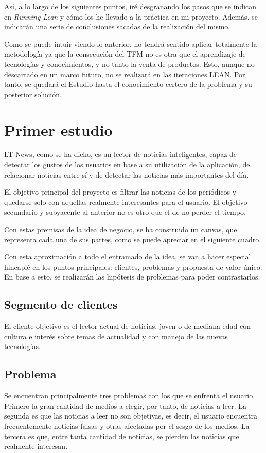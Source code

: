 Así, a lo largo de los siguientes puntos, iré desgranando los pasos que se indican en \textit{Running Lean} y cómo los he llevado a la práctica en mi proyecto. Además, se indicarán una serie de conclusiones sacadas de la realización del mismo.

Como se puede intuir viendo lo anterior, no tendrá sentido aplicar totalmente la metodología ya que la consecución del TFM no es otra que el aprendizaje de tecnologías y conocimientos, y no tanto la venta de productos. Esto, aunque no descartado en un marco futuro, no se realizará en las iteraciones LEAN. Por tanto, se quedará el Estudio hasta el conocimiento certero de la problema y su posterior solución.


\section{Primer estudio}\label{sec:primer_estudio}

LT-News, como se ha dicho, es un lector de noticias inteligentes, capaz de detectar los gustos de los usuarios en base a su utilización de la aplicación, de relacionar noticias entre sí y de detectar las noticias más importantes del día.

El objetivo principal del proyecto es filtrar las noticias de los periódicos y quedarse solo con aquellas realmente interesantes para el usuario. El objetivo secundario y subyacente al anterior no es otro que el de no perder el tiempo.

Con estas premisas de la idea de negocio, se ha construido un canvas, que representa cada una de sus partes, como se puede apreciar en el siguiente cuadro.


Con esta aproximación a todo el entramado de la idea, se van a hacer especial hincapié en los puntos principales: clientes, problemas y propuesta de valor único. En base a esto, se realizarán las hipótesis de problemas para poder contrastarlos.

\subsection{Segmento de clientes}
El cliente objetivo es el lector actual de noticias, joven o de mediana edad con cultura e interés sobre temas de actualidad y con manejo de las nuevas tecnologías. 

\subsection{Problema}
Se encuentran principalmente tres problemas con los que se enfrenta el usuario. Primero la gran cantidad de medios a elegir, por tanto, de noticias a leer. La segunda es que las noticias a leer no son objetivas, es decir, el usuario encuentra frecuentemente noticias falsas y otras afectadas por el sesgo de los medios. La tercera es que, entre tanta cantidad de noticias, se pierden las noticias que realmente interesan.

